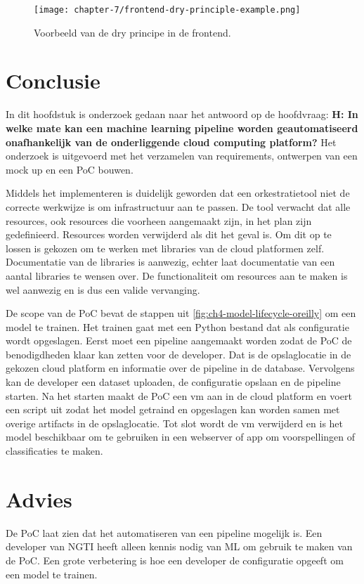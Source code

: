 \begin{figure}[hbt!]
  \centering
  \texttt{[image: chapter-7/frontend-dry-principle-example.png]}
  \caption{Voorbeeld van de \acrfull{dry} principe in de frontend.}
  \label{fig:ch7-frontend-dry-principle-example}
\end{figure}


\section{Conclusie}\label{sec:ch7-conclusie}
In dit hoofdstuk is onderzoek gedaan naar het antwoord op de hoofdvraag: \textbf{H: In welke mate kan een machine learning pipeline worden geautomatiseerd onafhankelijk van de onderliggende cloud computing platform?} Het onderzoek is uitgevoerd met het verzamelen van requirements, ontwerpen van een mock up en een PoC bouwen.

Middels het implementeren is duidelijk geworden dat een orkestratietool niet de correcte werkwijze is om infrastructuur aan te passen. De tool verwacht dat alle resources, ook resources die voorheen aangemaakt zijn, in het plan zijn gedefinieerd. Resources worden verwijderd als dit het geval is. Om dit op te lossen is gekozen om te werken met libraries van de cloud platformen zelf. Documentatie van de libraries is aanwezig, echter laat documentatie van een aantal libraries te wensen over. De functionaliteit om resources aan te maken is wel aanwezig en is dus een valide vervanging.

De scope van de PoC bevat de stappen uit \autoref{fig:ch4-model-lifecycle-oreilly} om een model te trainen. Het trainen gaat met een Python bestand dat als configuratie wordt opgeslagen. Eerst moet een pipeline aangemaakt worden zodat de PoC de benodigdheden klaar kan zetten voor de developer. Dat is de opslaglocatie in de gekozen cloud platform en informatie over de pipeline in de database. Vervolgens kan de developer een dataset uploaden, de configuratie opslaan en de pipeline starten. Na het starten maakt de PoC een \acrshort{vm} aan in de cloud platform en voert een script uit zodat het model getraind en opgeslagen kan worden samen met overige \glspl{artifact} in de opslaglocatie. Tot slot wordt de \acrshort{vm} verwijderd en is het model beschikbaar om te gebruiken in een webserver of app om voorspellingen of classificaties te maken.

\section{Advies}\label{sec:ch7-advies}
De PoC laat zien dat het automatiseren van een pipeline mogelijk is. Een developer van NGTI heeft alleen kennis nodig van ML om gebruik te maken van de PoC. Een grote verbetering is hoe een developer de configuratie opgeeft om een model te trainen.


